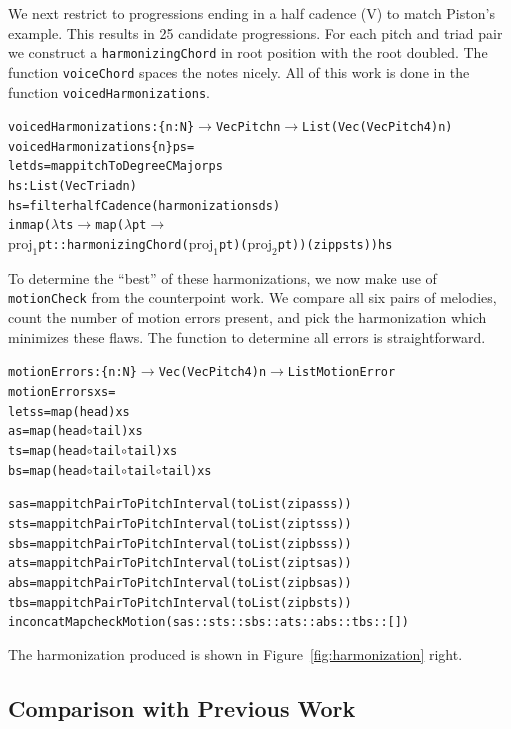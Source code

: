 We next restrict to progressions ending in a half cadence (V) to match
Piston's example. This results in 25
candidate progressions. For each pitch and triad pair we construct a
\texttt{harmonizingChord} in root position with the root doubled. The
function \texttt{voiceChord} spaces the notes nicely. All of this work
is done in the function \texttt{voicedHarmonizations}.

\begin{alltt}
voicedHarmonizations : \{n : N\} \(\rightarrow\) Vec Pitch n \(\rightarrow\) List (Vec (Vec Pitch 4) n)
voicedHarmonizations \{n\} ps =
  let ds = map pitchToDegreeCMajor ps
      hs : List (Vec Triad n)
      hs = filter halfCadence (harmonizations ds)
      in map (\(\lambda\) ts \(\rightarrow\) map (\(\lambda\) pt \(\rightarrow\)
             \(\text{proj}_1\) pt :: harmonizingChord (\(\text{proj}_1\) pt) (\(\text{proj}_2\) pt)) (zip ps ts)) hs
\end{alltt}

To determine the ``best'' of these harmonizations, we now make use of
\texttt{motionCheck} from the counterpoint work. We compare all six
pairs of melodies, count the number of motion errors present, and pick
the harmonization which minimizes these flaws. The function to
determine all errors is straightforward.

\begin{alltt}
motionErrors : \{n : N\} \(\rightarrow\) Vec (Vec Pitch 4) n \(\rightarrow\) List MotionError
motionErrors xs =
  let ss = map (head) xs
      as = map (head \(\circ\) tail) xs
      ts = map (head \(\circ\) tail \(\circ\) tail) xs
      bs = map (head \(\circ\) tail \(\circ\) tail \(\circ\) tail) xs

      sas = map pitchPairToPitchInterval (toList (zip as ss))
      sts = map pitchPairToPitchInterval (toList (zip ts ss))
      sbs = map pitchPairToPitchInterval (toList (zip bs ss))
      ats = map pitchPairToPitchInterval (toList (zip ts as))
      abs = map pitchPairToPitchInterval (toList (zip bs as))
      tbs = map pitchPairToPitchInterval (toList (zip bs ts))
  in concatMap checkMotion (sas :: sts :: sbs :: ats :: abs :: tbs :: [])
\end{alltt}

The harmonization produced is shown in Figure~\ref{fig:harmonization}
right.

\subsection{Comparison with Previous Work}
\label{sec:harmony:compare}

